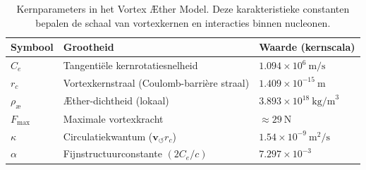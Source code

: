 \begin{table}[h!]
    \centering
    \begin{tabular}{lll}
        \hline
        Symbool & Grootheid & Waarde (kernscala)\\
        \hline
        $C_e$ & Tangentiële kernrotatiesnelheid & $1.094\times10^6~\text{m/s}$\\
        $r_c$ & Vortexkernstraal (Coulomb-barrière straal) & $1.409\times10^{-15}~\text{m}$\\
        $\rho_\text{\ae}$ & Æther-dichtheid (lokaal) & $3.893\times10^{18}~\text{kg/m}^3$\\
        $F_{\max}$ & Maximale vortexkracht & $\approx 29~\text{N}$\\
        $\kappa$ & Circulatiekwantum ($\mathbf{v}_{\scriptscriptstyle\boldsymbol{\circlearrowleft}} r_c$) & $1.54\times10^{-9}~\text{m}^2/\text{s}$\\
        $\alpha$ & Fijnstructuurconstante $(2C_e/c)$ & $7.297\times10^{-3}$\\
        \hline
    \end{tabular}
    \caption{Kernparameters in het Vortex Æther Model. Deze karakteristieke constanten bepalen de schaal van vortexkernen en interacties binnen nucleonen.}
\end{table}